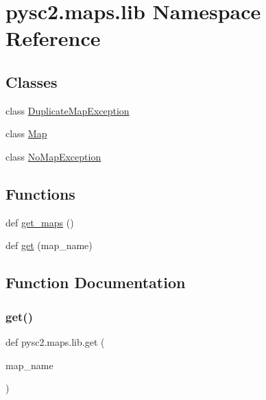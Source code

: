 \hypertarget{namespacepysc2_1_1maps_1_1lib}{}\section{pysc2.\+maps.\+lib Namespace Reference}
\label{namespacepysc2_1_1maps_1_1lib}
\subsection*{Classes}
\begin{DoxyCompactItemize}
\item 
class \mbox{\hyperlink{classpysc2_1_1maps_1_1lib_1_1_duplicate_map_exception}{Duplicate\+Map\+Exception}}
\item 
class \mbox{\hyperlink{classpysc2_1_1maps_1_1lib_1_1_map}{Map}}
\item 
class \mbox{\hyperlink{classpysc2_1_1maps_1_1lib_1_1_no_map_exception}{No\+Map\+Exception}}
\end{DoxyCompactItemize}
\subsection*{Functions}
\begin{DoxyCompactItemize}
\item 
def \mbox{\hyperlink{namespacepysc2_1_1maps_1_1lib_a60ff5f8b1af2571cee78b513d0b797eb}{get\+\_\+maps}} ()
\item 
def \mbox{\hyperlink{namespacepysc2_1_1maps_1_1lib_ae696486d5bc32fc538d6cfeb7e8f5f09}{get}} (map\+\_\+name)
\end{DoxyCompactItemize}


\subsection{Function Documentation}
\mbox{\label{namespacepysc2_1_1maps_1_1lib_ae696486d5bc32fc538d6cfeb7e8f5f09}} 
\subsubsection{\texorpdfstring{get()}{get()}}
{\footnotesize\ttfamily def pysc2.\+maps.\+lib.\+get (\begin{DoxyParamCaption}\item[{}]{map\+\_\+name }\end{DoxyParamCaption})}

